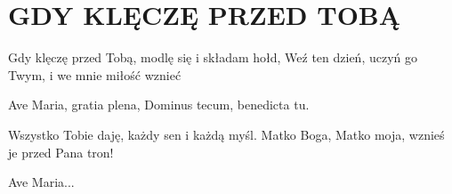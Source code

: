 \documentclass[../../../songbook.tex]{subfiles}
\begin{document}
\TabPositions{8cm} %
\section*{GDY KLĘCZĘ PRZED TOBĄ}
{}
\vspace{0.5cm}
Gdy klęczę przed Tobą,				 \newline
modlę się i składam hołd,			 \newline
Weź ten dzień, uczyń go Twym,		 \newline
i we mnie miłość wznieć				 \newline

\-\hspace{1cm} Ave Maria, gratia plena, \newline
\-\hspace{1cm} Dominus tecum, benedicta tu. \newline

Wszystko Tobie daję, \newline
każdy sen i każdą myśl. \newline
Matko Boga, Matko moja, \newline
wznieś je przed Pana tron! \newline

\-\hspace{1cm} Ave Maria... \newline
\end{document}
